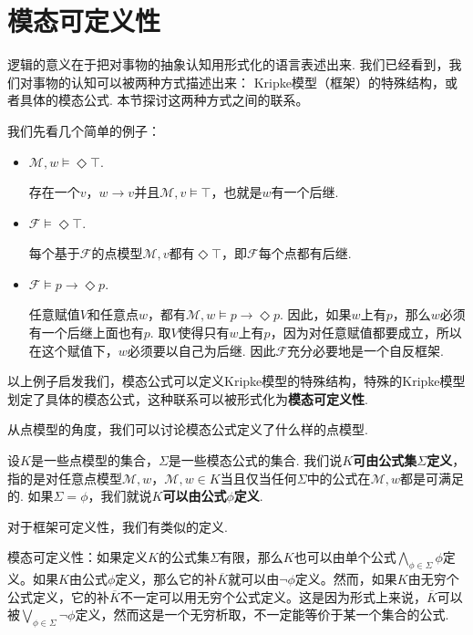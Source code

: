 \section{模态可定义性}

逻辑的意义在于把对事物的抽象认知用形式化的语言表述出来. 我们已经看到，我们对事物的认知可以被两种方式描述出来： Kripke模型（框架）的特殊结构，或者具体的模态公式. 本节探讨这两种方式之间的联系。

我们先看几个简单的例子：
\begin{example}
\begin{itemize}
    \item $\mathcal M,w\vDash\Diamond\top$.

    存在一个$v$，$w\to v$并且$\mathcal M,v\vDash\top$，也就是$w$有一个后继.

    \item $\mathcal F\vDash\Diamond \top$.
    
    每个基于$\mathcal F$的点模型$\mathcal M,v$都有$\Diamond \top$，即$\mathcal F$每个点都有后继.

    \item $\mathcal F\vDash p\to\Diamond p$.
    
    任意赋值$V$和任意点$w$，都有$\mathcal M,w\vDash p\to\Diamond p$. 因此，如果$w$上有$p$，那么$w$必须有一个后继上面也有$p$. 取$V$使得只有$w$上有$p$，因为对任意赋值都要成立，所以在这个赋值下，$w$必须要以自己为后继. 因此$\mathcal F$充分必要地是一个自反框架.
    \end{itemize}
\end{example}

以上例子启发我们，模态公式可以定义Kripke模型的特殊结构，特殊的Kripke模型划定了具体的模态公式，这种联系可以被形式化为\textbf{模态可定义性}.

从点模型的角度，我们可以讨论模态公式定义了什么样的点模型. 

\begin{definition}[点模型可定义性]
设$K$是一些点模型的集合，$\Sigma$是一些模态公式的集合. 我们说\textbf{$K$可由公式集$\Sigma$定义}，指的是对任意点模型$\mathcal M,w$，$\mathcal M,w\in K$当且仅当任何$\Sigma$中的公式在$\mathcal M,w$都是可满足的. 如果$\Sigma={\phi}$，我们就说\textbf{$K$可以由公式$\phi$定义}. 
\end{definition}
对于框架可定义性，我们有类似的定义.

模态可定义性：如果定义$K$的公式集$\Sigma$有限，那么$K$也可以由单个公式$\bigwedge_{\phi\in\Sigma}\phi$定义。如果$K$由公式$\phi$定义，那么它的补$\overline{K}$就可以由$\neg\phi$定义。然而，如果$K$由无穷个公式定义，它的补$\overline{K}$不一定可以用无穷个公式定义。这是因为形式上来说，$\overline{K}$可以被$\bigvee_{\phi\in\Sigma}\neg\phi$定义，然而这是一个无穷析取，不一定能等价于某一个集合的公式.

